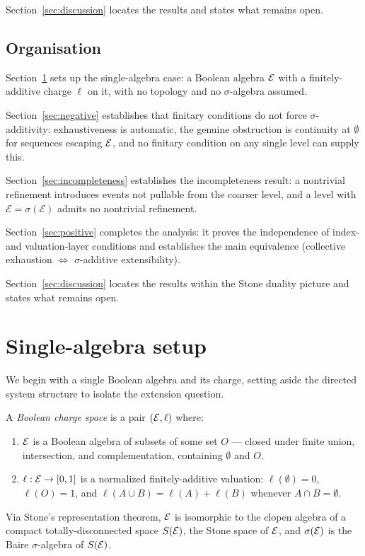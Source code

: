 Section~\ref{sec:discussion} locates the results and states what remains open.

\subsection{Organisation}

Section~\ref{sec:setup} sets up the single-algebra case: a Boolean algebra $\mathcal{E}$ with
a finitely-additive charge $\ell$ on it, with no topology and no $\sigma$-algebra assumed.

Section~\ref{sec:negative} establishes that finitary conditions do not force
$\sigma$-additivity: exhaustiveness is automatic, the genuine obstruction is
continuity at $\emptyset$ for sequences escaping $\mathcal{E}$, and no finitary condition
on any single level can supply this.

Section~\ref{sec:incompleteness} establishes the incompleteness result: a nontrivial
refinement introduces events not pullable from the coarser level, and a level with
$\mathcal{E} = \sigma(\mathcal{E})$ admits no nontrivial refinement.

Section~\ref{sec:positive} completes the analysis: it proves the independence of
index- and valuation-layer conditions and establishes the main equivalence (collective
exhaustion $\iff$ $\sigma$-additive extensibility).

Section~\ref{sec:discussion} locates the results within the Stone duality picture and
states what remains open.

\section{Single-algebra setup}
\label{sec:setup}

We begin with a single Boolean algebra and its charge, setting aside the directed
system structure to isolate the extension question.

\begin{definition}
A \emph{Boolean charge space} is a pair $(\mathcal{E}, \ell)$ where:
\begin{enumerate}[label=(\roman*)]
  \item $\mathcal{E}$ is a Boolean algebra of subsets of some set $O$ --- closed under finite
    union, intersection, and complementation, containing $\emptyset$ and $O$.
  \item $\ell : \mathcal{E} \to [0,1]$ is a normalized finitely-additive valuation:
    $\ell(\emptyset) = 0$, $\ell(O) = 1$, and $\ell(A \cup B) = \ell(A) + \ell(B)$
    whenever $A \cap B = \emptyset$.
\end{enumerate}
Via Stone's representation theorem, $\mathcal{E}$ is isomorphic to the clopen algebra of
a compact totally-disconnected space $S(\mathcal{E})$, the Stone space of $\mathcal{E}$, and
$\sigma(\mathcal{E})$ is the Baire $\sigma$-algebra of $S(\mathcal{E})$.
\end{definition}

